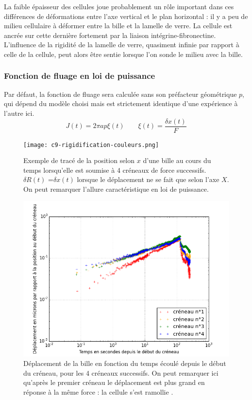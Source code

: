 La faible épaisseur des cellules joue probablement un rôle important dans ces différences de déformations entre l'axe vertical et le plan horizontal : il y a peu de milieu cellulaire à déformer entre la bille et la lamelle de verre. La cellule est ancrée sur cette dernière fortement par la liaison intégrine-fibronectine. L'influence de la rigidité de la lamelle de verre, quasiment infinie par rapport à celle de la cellule, peut alors être sentie lorsque l'on sonde le milieu avec la bille. 



\subsubsection{Fonction de fluage en loi de puissance}

Par défaut, la fonction de fluage sera calculée sans son préfacteur géométrique $p$, qui dépend du modèle choisi mais est strictement identique d'une expérience à l'autre ici.
$$ J(t) = 2 \pi a p \xi (t)\qquad \xi (t) = \frac{\delta x (t)}{F}$$
	
\begin{figure}
\texttt{[image: c9-rigidification-couleurs.png]}

\caption{Exemple de tracé de la position selon $x$ d'une bille au cours du temps lorsqu'elle est soumise à 4 créneaux de force successifs. $\delta R(t)$ =$\delta x(t)$ lorsque le déplacement ne se fait que selon l'axe $X$. On peut remarquer l'allure caractéristique en loi de puissance.\label{Exemple}} 
	\includegraphics[scale=0.5]{Figures/Exemple_C162_loglog.png}
	\caption{Déplacement de la bille en fonction du temps écoulé depuis le début du créneau, pour les 4 créneaux successifs. On peut remarquer ici qu'après le premier créneau le déplacement est plus grand en réponse à la même force : la cellule s'est \og ramollie \fg. }
\end{figure}

